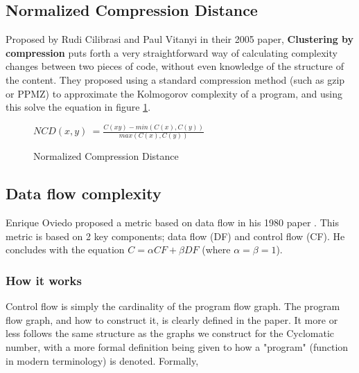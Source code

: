 \documentclass[]{article}
\begin{document}
\subsection{Normalized Compression Distance}

Proposed by Rudi Cilibrasi and Paul Vitanyi in their 2005 paper, \textbf{Clustering by compression} \cite{ref:cilibrasi2005clustering} puts forth a very straightforward way of calculating complexity changes between two pieces of code, without even knowledge of the structure of the content.
They proposed using a standard compression method (such as gzip or PPMZ) to approximate the Kolmogorov complexity of a program, and using this solve the equation in figure \ref{ncd_eq_1}.


\begin{figure}[h]
	\caption{Normalized Compression Distance}
	\label{ncd_eq_1}
	\centering
	$NCD(x,y) ~= \frac{C(xy) - min(C(x),C(y))}{max(C(x),C(y))}$
\end{figure}


\subsection{Data flow complexity}

Enrique Oviedo proposed a metric based on data flow in his 1980 paper \cite{ref:oviedo1993control}.
This metric is based on 2 key components; data flow (DF) and control flow (CF).
He concludes with the equation $C = \alpha CF + \beta DF$ (where $\alpha=\beta=1$).

\subsubsection{How it works}

Control flow is simply the cardinality of the program flow graph.
The program flow graph, and how to construct it, is clearly defined in the paper.
It more or less follows the same structure as the graphs we construct for the Cyclomatic number, with a more formal definition being given to how a "program" (function in modern terminology) is denoted.
Formally,
\end{document}
